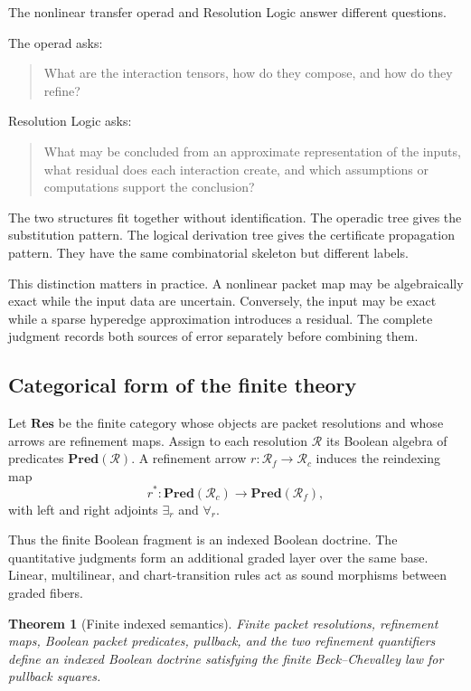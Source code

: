 \documentclass[11pt]{article}
\newtheorem{theorem}{Theorem}[section]
\theoremstyle{definition}
\theoremstyle{remark}
\begin{document}
The nonlinear transfer operad and Resolution Logic answer different questions.

The operad asks:
\begin{quote}
What are the interaction tensors, how do they compose, and how do they refine?
\end{quote}

Resolution Logic asks:
\begin{quote}
What may be concluded from an approximate representation of the inputs, what residual does each interaction create, and which assumptions or computations support the conclusion?
\end{quote}

The two structures fit together without identification.  The operadic tree gives the substitution pattern.  The logical derivation tree gives the certificate propagation pattern.  They have the same combinatorial skeleton but different labels.

This distinction matters in practice.  A nonlinear packet map may be algebraically exact while the input data are uncertain.  Conversely, the input may be exact while a sparse hyperedge approximation introduces a residual.  The complete judgment records both sources of error separately before combining them.

\subsection{Categorical form of the finite theory}

Let $\mathbf{Res}$ be the finite category whose objects are packet resolutions and whose arrows are refinement maps.  Assign to each resolution $\mathcal R$ its Boolean algebra of predicates $\mathbf{Pred}(\mathcal R)$.  A refinement arrow $r:\mathcal R_f\to\mathcal R_c$ induces the reindexing map
\[
   r^*:\mathbf{Pred}(\mathcal R_c)
   \to
   \mathbf{Pred}(\mathcal R_f),
\]
with left and right adjoints $\exists_r$ and $\forall_r$.

Thus the finite Boolean fragment is an indexed Boolean doctrine.  The quantitative judgments form an additional graded layer over the same base.  Linear, multilinear, and chart-transition rules act as sound morphisms between graded fibers.

\begin{theorem}[Finite indexed semantics]
Finite packet resolutions, refinement maps, Boolean packet predicates, pullback, and the two refinement quantifiers define an indexed Boolean doctrine satisfying the finite Beck--Chevalley law for pullback squares.
\end{theorem}
\end{document}

